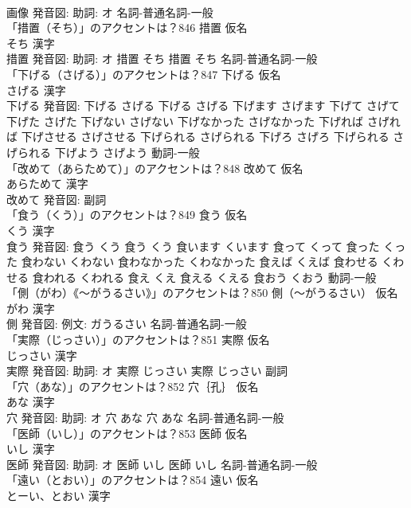 \documentclass[8pt]{extreport}
\begin{document}
\begin{CJK}{UTF8}{min}
\\	画像 発音図: 助詞: オ							名詞-普通名詞-一般 
\\	「措置（そち）」のアクセントは？846	措置 仮名　
\\	そち 漢字　
\\	措置 発音図: 助詞: オ	措置 そち		措置 そち				名詞-普通名詞-一般 
\\	「下げる（さげる）」のアクセントは？847	下げる 仮名　
\\	さげる 漢字　
\\	下げる 発音図:	下げる さげる		下げる さげる 下げます さげます 下げて さげて 下げた さげた 下げない さげない 下げなかった さげなかった 下げれば さげれば 下げさせる さげさせる 下げられる さげられる 下げろ さげろ 下げられる さげられる 下げよう さげよう				動詞-一般 
\\	「改めて（あらためて）」のアクセントは？848	改めて 仮名　
\\	あらためて 漢字　
\\	改めて 発音図:							副詞 
\\	「食う（くう）」のアクセントは？849	食う 仮名　
\\	くう 漢字　
\\	食う 発音図:	食う くう		食う くう 食います くいます 食って くって 食った くった 食わない くわない 食わなかった くわなかった 食えば くえば 食わせる くわせる 食われる くわれる 食え くえ 食える くえる 食おう くおう				動詞-一般 
\\	「側（がわ）《〜がうるさい》」のアクセントは？850	側（〜がうるさい） 仮名　
\\	がわ 漢字　
\\	側 発音図: 例文: ガうるさい							名詞-普通名詞-一般 
\\	「実際（じっさい）」のアクセントは？851	実際 仮名　
\\	じっさい 漢字　
\\	実際 発音図: 助詞: オ	実際 じっさい		実際 じっさい				副詞 
\\	「穴（あな）」のアクセントは？852	穴｛孔｝ 仮名　
\\	あな 漢字　
\\	穴 発音図: 助詞: オ	穴 あな		穴 あな				名詞-普通名詞-一般 
\\	「医師（いし）」のアクセントは？853	医師 仮名　
\\	いし 漢字　
\\	医師 発音図: 助詞: オ	医師 いし		医師 いし				名詞-普通名詞-一般 
\\	「遠い（とおい）」のアクセントは？854	遠い 仮名　
\\	とーい、とおい 漢字　

\end{CJK}
\end{document}
